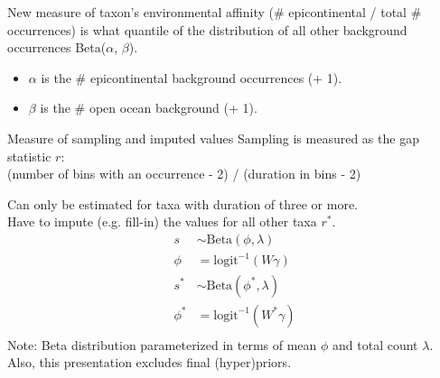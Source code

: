 \documentclass{beamer}
\begin{document}
\begin{frame}
  \begin{block}{New measure of taxon's environmental affinity}
    (\# epicontinental / total \# occurrences) is what quantile of the distribution of all other background occurrences Beta(\(\alpha\), \(\beta\)).
    \begin{itemize}
      \item \(\alpha\) is the \# epicontinental background occurrences (+ 1).
      \item \(\beta\) is the \# open ocean background (+ 1).
    \end{itemize}
  \end{block}
\end{frame}

\begin{frame}
  \begin{block}{Measure of sampling and imputed values}
    Sampling is measured as the gap statistic \(r\): \\(number of bins with an occurrence - 2) / (duration in bins - 2)

    Can only be estimated for taxa with duration of three or more. \\Have to impute (e.g. fill-in) the values for all other taxa \(r^{\ast}\).
    \begin{align*}
      s &\sim \text{Beta}(\phi, \lambda) \\
      \phi &= \text{logit}^{-1}(W\gamma) \\
      s^{\ast} &\sim \text{Beta}(\phi^{\ast}, \lambda) \\
      \phi^{\ast} &= \text{logit}^{-1}(W^{\ast}\gamma) \\
    \end{align*}
    \scriptsize{Note: Beta distribution parameterized in terms of mean \(\phi\) and total count \(\lambda\). \\Also, this presentation excludes final (hyper)priors.}
  \end{block}
\end{frame}
\end{document}
